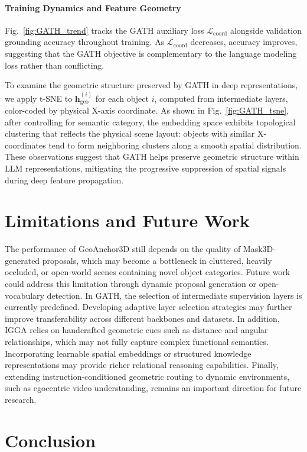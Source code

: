 \documentclass[lettersize,journal]{IEEEtran}
\begin{document}
\paragraph*{Training Dynamics and Feature Geometry}Fig.~\ref{fig:GATH_trend} tracks {the GATH auxiliary loss} $\mathcal{L}_{\text{coord}}$ alongside {validation} grounding accuracy throughout training. As {$\mathcal{L}_{\text{coord}}$} decreases, accuracy improves, suggesting that the GATH objective is complementary to the language modeling loss rather than conflicting.

To examine the geometric structure preserved by GATH in deep representations, we apply t-SNE to $\mathbf{h}_{\text{geo}}^{(i)}$ {for each object $i$, computed} from intermediate layers, color-coded by physical X-axis coordinate. As shown in Fig.~\ref{fig:GATH_tsne}, after controlling for semantic category, the embedding space exhibits topological clustering that reflects the physical scene layout: objects with similar X-coordinates tend to form neighboring clusters along a smooth spatial distribution. These observations suggest that GATH helps preserve geometric structure within LLM representations, mitigating the progressive suppression of spatial signals during deep feature propagation.

\section{Limitations and Future Work}
The performance of GeoAnchor3D still depends on the quality of Mask3D-generated proposals, which may become a bottleneck in cluttered, heavily occluded, or open-world scenes containing novel object categories. Future work could address this limitation through dynamic proposal generation or open-vocabulary detection. In GATH, the selection of intermediate supervision layers is currently predefined. Developing adaptive layer selection strategies may further improve transferability across different backbones and datasets. In addition, IGGA relies on handcrafted geometric cues such as distance and angular relationships, which may not fully capture complex functional semantics. Incorporating learnable spatial embeddings or structured knowledge representations may provide richer relational reasoning capabilities. Finally, extending instruction-conditioned {geometric} routing to dynamic environments, such as egocentric video understanding, remains an important direction for future research.

\section{Conclusion}
\end{document}
